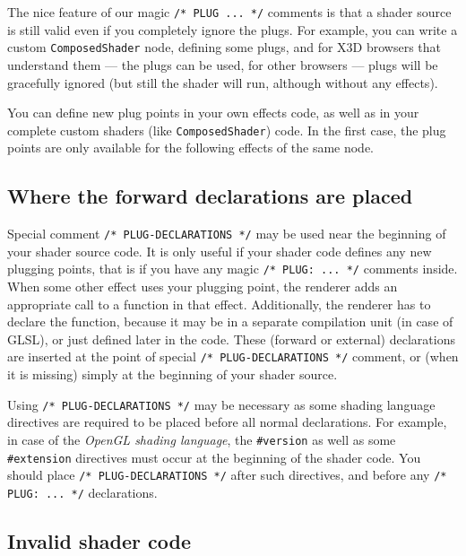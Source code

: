 \documentclass{egpubl}
\begin{document}
The nice feature of our magic \texttt{/* PLUG ... */} comments is that a shader source
is still valid even if you completely ignore the plugs. For example,
you can write a custom \texttt{ComposedShader} node, defining some plugs,
and for X3D browsers that understand them --- the plugs can be used,
for other browsers --- plugs will be gracefully ignored (but still
the shader will run, although without any effects).

You can define new plug points in your own effects code, as well as in your
complete custom shaders (like \texttt{ComposedShader}) code.
In the first case, the plug points
are only available for the following effects of the same node.

\subsection{Where the forward declarations are placed}

Special comment \texttt{/* PLUG-DECLARATIONS */} may be used
near the beginning of your shader source code. It is only useful
if your shader code defines any new plugging points, that is if you
have any magic \texttt{/* PLUG: ... */} comments inside.
When some other effect uses your plugging point, the renderer adds
an appropriate call to a function in that effect.
Additionally, the renderer has to declare the function,
because it may be in a separate compilation unit (in case of GLSL),
or just defined later in the code.
These (forward or external) declarations are inserted at
the point of special \texttt{/* PLUG-DECLARATIONS */}
comment, or (when it is missing) simply at the beginning of your shader source.

Using \texttt{/* PLUG-DECLARATIONS */} may be necessary
as some shading language directives are required to be placed before
all normal declarations. For example, in case of the \emph{OpenGL shading language},
the \texttt{\#version} as well as some \texttt{\#extension} directives
must occur at the beginning of the shader code. You should place
\texttt{/* PLUG-DECLARATIONS */} after such directives,
and before any \texttt{/* PLUG: ... */} declarations.

\subsection{Invalid shader code}
\end{document}
